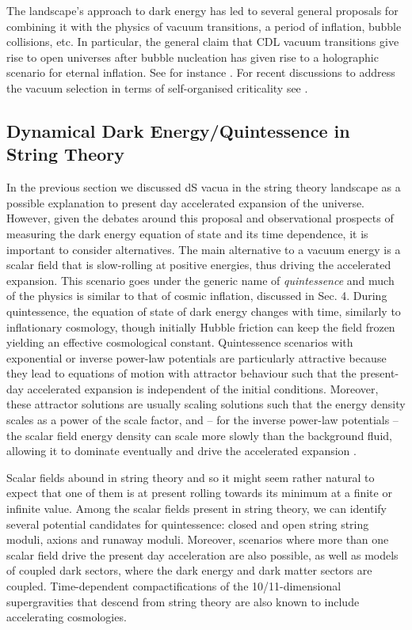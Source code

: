 The landscape's approach to dark energy has led to several general proposals for combining it with the physics of vacuum transitions, a period of inflation, bubble collisions, etc. In particular, the general claim  that CDL vacuum transitions give rise to open universes after bubble nucleation has given rise to a holographic scenario for eternal inflation. See for instance \cite{Freivogel:2006xu,Sekino:2009kv}. For recent discussions to address the vacuum selection in terms of self-organised criticality see \cite{Kartvelishvili:2020thd,Giudice:2021viw}.

\subsection{Dynamical Dark Energy/Quintessence in String Theory}

In the previous section we discussed dS vacua in the string theory landscape as a possible explanation to present day accelerated expansion of the universe. However, given the debates around this proposal and observational prospects of measuring the dark energy equation of state and its time dependence, it is important to consider alternatives. The main alternative to a vacuum energy is a scalar field that is slow-rolling at positive energies, thus driving the accelerated expansion. This scenario goes under the generic name of {\em quintessence} \cite{Ratra:1987rm,Caldwell:1997ii} and much of the physics is similar to that of cosmic inflation, discussed in Sec. 4.
During quintessence, the equation of state of dark energy changes with time, similarly to inflationary cosmology, though initially Hubble friction can keep the field frozen yielding an effective cosmological constant. Quintessence scenarios with exponential or inverse power-law potentials are particularly attractive because they lead to equations of motion with attractor behaviour \cite{Ratra:1987rm} such that the present-day accelerated expansion is independent of the initial conditions. Moreover, these attractor solutions are usually scaling solutions such that the energy density scales as a power of the scale factor, and -- for the inverse power-law potentials -- the scalar field energy density can scale more slowly than the background fluid, allowing it to dominate eventually and drive the accelerated expansion \cite{Liddle:1998xm}.
 
Scalar fields abound in string theory and so it might seem rather natural to expect that one of them is at present rolling towards its minimum at a finite or infinite value. Among the scalar fields present in string theory, we can identify several potential candidates for quintessence: closed and open string string moduli, axions and runaway moduli. Moreover, scenarios where more than one scalar field drive the present day acceleration are also possible, as well as models of coupled dark sectors, where the dark energy and dark matter sectors are coupled. Time-dependent compactifications of the 10/11-dimensional supergravities that descend from string theory are also known to include accelerating cosmologies.

